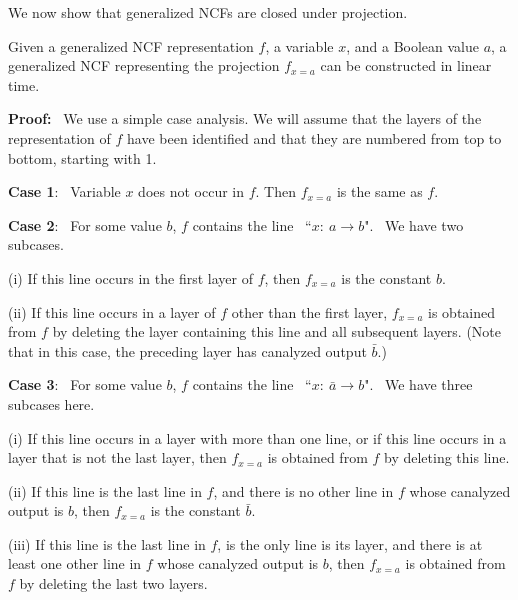 \noindent
We now show that generalized NCFs are closed under projection.

\begin{lemma}\label{lem:projection}
Given a generalized NCF representation $f$, a variable $x$, and a
Boolean value $a$, a generalized NCF representing the projection
$f_{x = a}$ can be constructed in linear time.
\end{lemma}

\noindent
\textbf{Proof:}~ We use a simple case analysis.
We will assume that the layers of the representation of $f$ have
been identified and that they are numbered 
from top to bottom, starting with 1.

\smallskip

\noindent
{\bf Case 1}:~ Variable $x$ does not occur in $f$.
Then  $f_{x = a}$ is the same as $f$.

\smallskip

\noindent
{\bf Case 2}:~ For some value $b$, $f$ contains the line~ 
``$x:~ a \longrightarrow b$".~
We have two subcases.
\begin{description}
\item {(i)} If this line occurs in the first layer of $f$, 
then $f_{x = a}$ is the constant $b$.

\item{(ii)} If this line occurs in a layer of $f$ other than the first layer, 
$f_{x = a}$ is obtained from $f$ by deleting 
the layer containing this line and all subsequent layers.
(Note that in this case, the preceding layer has canalyzed output $\bar{b}$.)
\end{description}


\noindent
{\bf Case 3}:~ For some value $b$, $f$ contains the line~
``$x:~ \bar{a} \longrightarrow b$".~
We have three subcases here.
\begin{description}
\item{(i)}
If this line occurs in a layer with more than one line, 
or if this line occurs in a layer that is not the last layer,
then $f_{x = a}$ is obtained from $f$ by deleting this line.
\item{(ii)}
If this line is the last line in $f$, 
and there is no other line in $f$ whose canalyzed output is $b$,
then $f_{x = a}$ is  the constant $\bar{b}$.
\item{(iii)}
If this line is the last line in $f$, is the only line is its layer, 
and there is at least one other line in $f$ whose canalyzed output is $b$,
then $f_{x = a}$ is obtained from $f$ by deleting the last two layers.
\end{description}
\QED
